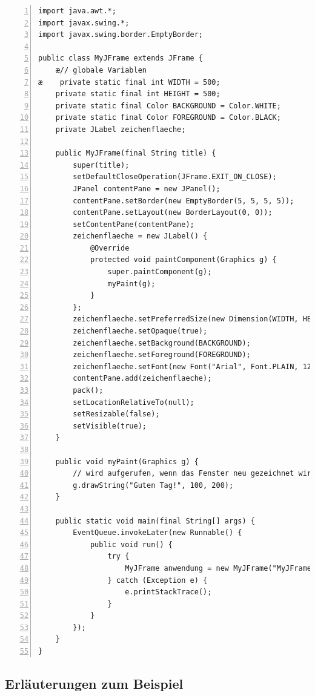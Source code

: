 \begin{lstlisting}[numbers=left, xleftmargin=7mm]
import java.awt.*;
import javax.swing.*;
import javax.swing.border.EmptyBorder;

public class MyJFrame extends JFrame {
    æ// globale Variablen
æ    private static final int WIDTH = 500;
    private static final int HEIGHT = 500;
    private static final Color BACKGROUND = Color.WHITE;
    private static final Color FOREGROUND = Color.BLACK;
    private JLabel zeichenflaeche;

    public MyJFrame(final String title) {
        super(title);
        setDefaultCloseOperation(JFrame.EXIT_ON_CLOSE);
        JPanel contentPane = new JPanel();
        contentPane.setBorder(new EmptyBorder(5, 5, 5, 5));
        contentPane.setLayout(new BorderLayout(0, 0));
        setContentPane(contentPane);
        zeichenflaeche = new JLabel() {
            @Override
            protected void paintComponent(Graphics g) {
                super.paintComponent(g);
                myPaint(g);
            }
        };
        zeichenflaeche.setPreferredSize(new Dimension(WIDTH, HEIGHT));
        zeichenflaeche.setOpaque(true);
        zeichenflaeche.setBackground(BACKGROUND);
        zeichenflaeche.setForeground(FOREGROUND);
        zeichenflaeche.setFont(new Font("Arial", Font.PLAIN, 12));
        contentPane.add(zeichenflaeche);
        pack();
        setLocationRelativeTo(null);
        setResizable(false);
        setVisible(true);
    }

    public void myPaint(Graphics g) {
        // wird aufgerufen, wenn das Fenster neu gezeichnet wird
        g.drawString("Guten Tag!", 100, 200);
    }

    public static void main(final String[] args) {
        EventQueue.invokeLater(new Runnable() {
            public void run() {
                try {
                    MyJFrame anwendung = new MyJFrame("MyJFrame");
                } catch (Exception e) {
                    e.printStackTrace();
                }
            }
        });
    }
}
\end{lstlisting}

\subsection{Erläuterungen zum Beispiel}

